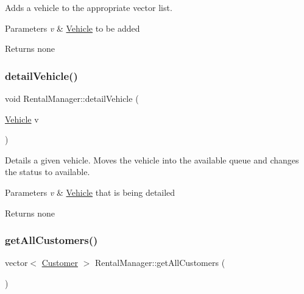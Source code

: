 Adds a vehicle to the appropriate vector list.


\begin{DoxyParams}{Parameters}
{\em v} & \hyperlink{class_vehicle}{Vehicle} to be added \\
\hline
\end{DoxyParams}
\begin{DoxyReturn}{Returns}
none 
\end{DoxyReturn}
\mbox{\label{class_rental_manager_a9854197a07ec70ee5300f9f1d6f96996}} 
\subsubsection{\texorpdfstring{detail\+Vehicle()}{detailVehicle()}}
{\footnotesize\ttfamily void Rental\+Manager\+::detail\+Vehicle (\begin{DoxyParamCaption}\item[{\hyperlink{class_vehicle}{Vehicle}}]{v }\end{DoxyParamCaption})}

Details a given vehicle. Moves the vehicle into the available queue and changes the status to available.


\begin{DoxyParams}{Parameters}
{\em v} & \hyperlink{class_vehicle}{Vehicle} that is being detailed \\
\hline
\end{DoxyParams}
\begin{DoxyReturn}{Returns}
none 
\end{DoxyReturn}
\mbox{\label{class_rental_manager_a86ea87b26b3617dffff621c88066d4f1}} 
\subsubsection{\texorpdfstring{get\+All\+Customers()}{getAllCustomers()}}
{\footnotesize\ttfamily vector$<$ \hyperlink{class_customer}{Customer} $>$ Rental\+Manager\+::get\+All\+Customers (\begin{DoxyParamCaption}{ }\end{DoxyParamCaption})}

